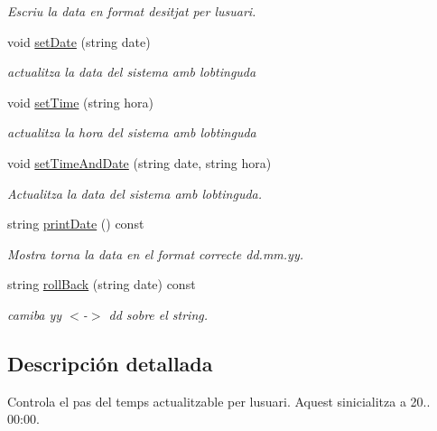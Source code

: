 \begin{DoxyCompactItemize}
\begin{DoxyCompactList}\small\item\em Escriu la data en format desitjat per l\textquotesingle{}usuari. \end{DoxyCompactList}\item 
void \hyperlink{class_rellotge_a19fc5ccb1b3949979f03f207f877c059}{set\+Date} (string date)
\begin{DoxyCompactList}\small\item\em actualitza la data del sistema amb l\textquotesingle{}obtinguda \end{DoxyCompactList}\item 
void \hyperlink{class_rellotge_a8b4ddc7c6b02397c415a2f0ca815dc04}{set\+Time} (string hora)
\begin{DoxyCompactList}\small\item\em actualitza la hora del sistema amb l\textquotesingle{}obtinguda \end{DoxyCompactList}\item 
void \hyperlink{class_rellotge_a418c7be8bf66f6e27291d6b77dcd969f}{set\+Time\+And\+Date} (string date, string hora)
\begin{DoxyCompactList}\small\item\em Actualitza la data del sistema amb l\textquotesingle{}obtinguda. \end{DoxyCompactList}\item 
string \hyperlink{class_rellotge_abd7aa59db639ffc1e29154ba8283d7ed}{print\+Date} () const 
\begin{DoxyCompactList}\small\item\em Mostra torna la data en el format correcte dd.\+mm.\+yy. \end{DoxyCompactList}\item 
string \hyperlink{class_rellotge_a8bce0def81a1b01aae191ac678bf4473}{roll\+Back} (string date) const 
\begin{DoxyCompactList}\small\item\em camiba yy $<$-\/$>$ dd sobre el string. \end{DoxyCompactList}\end{DoxyCompactItemize}


\subsection{Descripción detallada}
Controla el pas del temps actualitzable per l\textquotesingle{}usuari. Aquest s\textquotesingle{}inicialitza a 20.. 00\+:00. 

